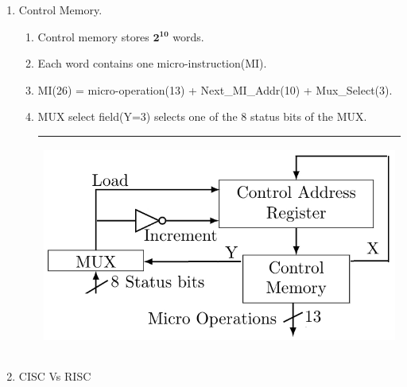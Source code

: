 \begin{enumerate}
    \item Control Memory.
    \begin{enumerate}
      \item Control memory stores \( \mathbf { 2^{10} } \) words.
      \item Each word contains one micro-instruction(MI).
      \item MI(26) = micro-operation(13) + Next\_MI\_Addr(10) + Mux\_Select(3).
      \item MUX select field(Y=3) selects one of the 8 status bits of the MUX.

          \begin{myTableStyle} \begin{tabular}{ |m{14cm}| } \hline
             \begin{center} \includegraphics[scale=0.4]{./images/control_memory.jpeg} \end{center}\\ \hline
          \end{tabular} \end{myTableStyle} \vspace{0.08in}
    \end{enumerate}

    \item CISC Vs RISC

\end{enumerate}
